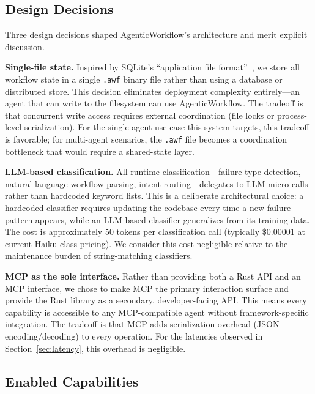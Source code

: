 \documentclass[10pt, twocolumn]{article}
\begin{document}
\subsection{Design Decisions}\label{sec:decisions}

Three design decisions shaped AgenticWorkflow's architecture and merit explicit discussion.

\textbf{Single-file state.} Inspired by SQLite's ``application file format''~\cite{sqlite}, we store all workflow state in a single \texttt{.awf} binary file rather than using a database or distributed store. This decision eliminates deployment complexity entirely---an agent that can write to the filesystem can use AgenticWorkflow. The tradeoff is that concurrent write access requires external coordination (file locks or process-level serialization). For the single-agent use case this system targets, this tradeoff is favorable; for multi-agent scenarios, the \texttt{.awf} file becomes a coordination bottleneck that would require a shared-state layer.

\textbf{LLM-based classification.} All runtime classification---failure type detection, natural language workflow parsing, intent routing---delegates to LLM micro-calls rather than hardcoded keyword lists. This is a deliberate architectural choice: a hardcoded classifier requires updating the codebase every time a new failure pattern appears, while an LLM-based classifier generalizes from its training data. The cost is approximately 50 tokens per classification call (typically \$0.00001 at current Haiku-class pricing). We consider this cost negligible relative to the maintenance burden of string-matching classifiers.

\textbf{MCP as the sole interface.} Rather than providing both a Rust API and an MCP interface, we chose to make MCP the primary interaction surface and provide the Rust library as a secondary, developer-facing API. This means every capability is accessible to any MCP-compatible agent without framework-specific integration. The tradeoff is that MCP adds serialization overhead (JSON encoding/decoding) to every operation. For the latencies observed in Section~\ref{sec:latency}, this overhead is negligible.

\subsection{Enabled Capabilities}\label{sec:enabled}
\end{document}
